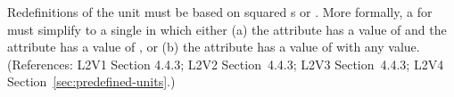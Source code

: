 Redefinitions of the  unit  must be based on squared
s or .  More formally, a \UnitDefinition
for  must simplify to a single \Unit in which either (a) the
 attribute has a value of  and the
 attribute has a value of , or (b) the
 attribute has a value of  with
any  value.  (References: L2V1 Section 4.4.3; L2V2
Section~4.4.3; L2V3 Section~4.4.3; L2V4 Section~\ref{sec:predefined-units}.)
